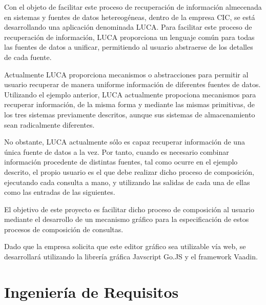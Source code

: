 \documentclass[a4paper,12pt]{article}
\newcounter{ns}
\begin{document}
	\vspace{5mm}
	
	
	 Con el objeto de facilitar este proceso de recuperación de información almecenada en sistemas y fuentes de datos hetereogéneas, dentro de la empresa	CIC, se está desarrollando una aplicación denominada LUCA. Para	facilitar este proceso de recuperación de información, LUCA proporciona un lenguaje común para todas las fuentes de datos a unificar, permitiendo al
	usuario abstraerse de los detalles de cada fuente.
	
	\vspace{5mm}
	
	 Actualmente LUCA proporciona mecanismos o abstracciones para permitir al	usuario recuperar de manera uniforme información de diferentes fuentes de datos.	Utilizando el ejemplo anterior, LUCA actualmente propociona mecanismos para
	recuperar información, de la misma forma y mediante las mismas primitivas, de los tres sistemas previamente descritos, aunque sus sistemas de almacenamiento sean radicalmente diferentes.
	
	\vspace{5mm}
	
	 No obstante, LUCA actualmente sólo es capaz recuperar información de una única fuente de datos a la vez. Por tanto, cuando es necesario combinar información procedente de distintas fuentes, tal como ocurre en el ejemplo descrito, el propio usuario es el que debe realizar dicho	proceso de composición, ejecutando cada consulta a mano, y utilizando las salidas de cada una de ellas como las entradas de las siguientes.
	 
	 \vspace{5mm}
	 
	 El objetivo de este proyecto es facilitar dicho proceso de composición al usuario mediante el desarrollo de un mecanismo gráfico para la especificación de estos procesos de composición de consultas.
	 
	 \vspace{5mm}
	 
	 Dado que la empresa solicita que este editor gráfico sea utilizable vía web, se desarrollará utilizando la librería gráfica Javscript Go.JS y el framework Vaadin.
	 
	  \afterpage{\null\newpage}
	 \newpage
	 
	
	
	\section{Ingeniería de Requisitos}
	
\end{document}

